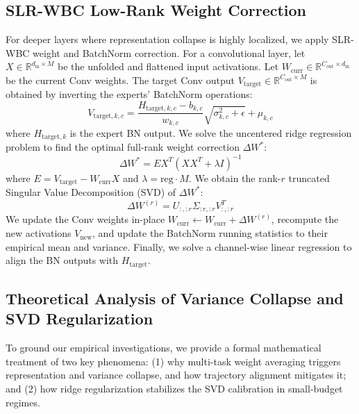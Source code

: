\documentclass{article}
\theoremstyle{plain}
\theoremstyle{definition}
\theoremstyle{remark}
\begin{document}
\subsection{SLR-WBC Low-Rank Weight Correction}
For deeper layers where representation collapse is highly localized, we apply SLR-WBC weight and BatchNorm correction. For a convolutional layer, let $X \in \mathbb{R}^{d_{\text{in}} \times M}$ be the unfolded and flattened input activations. Let $W_{\text{curr}} \in \mathbb{R}^{C_{\text{out}} \times d_{\text{in}}}$ be the current Conv weights. The target Conv output $V_{\text{target}} \in \mathbb{R}^{C_{\text{out}} \times M}$ is obtained by inverting the experts' BatchNorm operations:
\begin{equation}
    V_{\text{target}, k, c} = \frac{H_{\text{target}, k, c} - b_{k, c}}{w_{k, c}} \sqrt{\sigma_{k, c}^2 + \epsilon} + \mu_{k, c}
\end{equation}
where $H_{\text{target}, k}$ is the expert BN output. We solve the uncentered ridge regression problem to find the optimal full-rank weight correction $\Delta W^*$:
\begin{equation}
    \Delta W^* = E X^T (X X^T + \lambda I)^{-1}
\end{equation}
where $E = V_{\text{target}} - W_{\text{curr}} X$ and $\lambda = \text{reg} \cdot M$. We obtain the rank-$r$ truncated Singular Value Decomposition (SVD) of $\Delta W^*$:
\begin{equation}
    \Delta W^{(r)} = U_{:, :r} \Sigma_{:r, :r} V^T_{:, :r}
\end{equation}
We update the Conv weights in-place $W_{\text{curr}} \leftarrow W_{\text{curr}} + \Delta W^{(r)}$, recompute the new activations $V_{\text{new}}$, and update the BatchNorm running statistics to their empirical mean and variance. Finally, we solve a channel-wise linear regression to align the BN outputs with $H_{\text{target}}$.

\subsection{Theoretical Analysis of Variance Collapse and SVD Regularization}
\label{sec:theoretical_analysis}
To ground our empirical investigations, we provide a formal mathematical treatment of two key phenomena: (1) why multi-task weight averaging triggers representation and variance collapse, and how trajectory alignment mitigates it; and (2) how ridge regularization stabilizes the SVD calibration in small-budget regimes.
\end{document}
